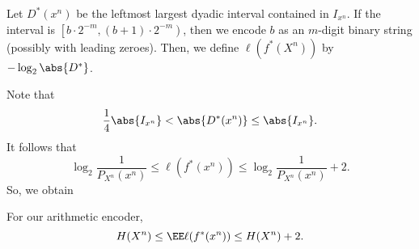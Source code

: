 Let $D^*(x^n)$ be the leftmost largest dyadic interval contained in $I_{x^n}$. If the interval is $\left[b \cdot 2^{-m}, (b+1)\cdot 2^{-m}\right)$, then we encode $b$ as an $m$-digit binary string (possibly with leading zeroes).
Then, we define $\ell(f^*(X^n))$ by $-\log_2 \abs{D^*}$.

Note that \[
	\frac 14 \abs{I_{x^n}} < \abs{D^*(x^n)} \leq \abs{I_{x^n}}.
\]
It follows that \[
	\log_2 \frac 1{P_{X^n}(x^n)} \leq \ell(f^*(x^n)) \leq \log_2 \frac 1{P_{X^n}(x^n)} + 2.
\]
So, we obtain 

\begin{fact}
	For our arithmetic encoder, \[
		H(X^n) \leq \EE \ell(f^*(x^n)) \leq H(X^n) + 2.
	\]
\end{fact}
